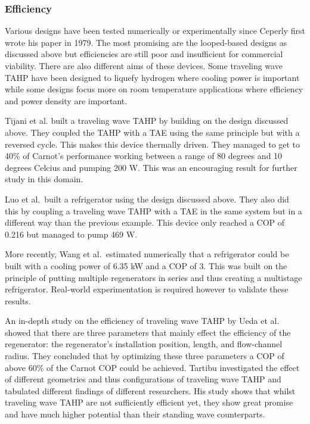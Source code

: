 \documentclass{article}
\newcommand{\newpara}
    {
      \bigbreak{}
      \noindent
    }
\begin{document}
\subsubsection{Efficiency}
Various designs have been tested numerically or experimentally since Ceperly first wrote his paper in 1979. The most promising are the looped-based designs as discussed above but efficiencies are still poor and insufficient for commercial viability. There are also different aims of these devices. Some traveling wave TAHP have been designed to liquefy hydrogen where cooling power is important while some designs focus more on room temperature applications where efficiency and power density are important\cite{WangRoomTemperature}.
\newpara{}
Tijani et al.\cite{spoelstraHighTemperature} built a traveling wave TAHP by building on the design discussed above. They coupled the TAHP with a TAE using the same principle but with a reversed cycle. This makes this device thermally driven. They managed to get to 40\% of Carnot's performance working between a range of 80 degrees and 10 degrees Celcius and pumping 200 W. This was an encouraging result for further study in this domain.
\newpara{}
Luo et al.\ built a refrigerator using the design discussed above\cite{LuoRefrigerator}. They also did this by coupling a traveling wave TAHP with a TAE in the same system but in a different way than the previous example. This device only reached a COP of 0.216 but managed to pump 469 W.
\newpara{}
More recently, Wang et al.\ estimated numerically that a refrigerator could be built with a cooling power of 6.35 kW and a COP of 3. This was built on the principle of putting multiple regenerators in series and thus creating a multistage refrigerator. Real-world experimentation is required however to validate these results.
\newpara{}
An in-depth study on the efficiency of traveling wave TAHP by Ueda et al. showed that there are three parameters that mainly effect the efficiency of the regenerator: the regenerator's installation position, length, and flow-channel radius\cite{uedaOptimization}. They concluded that by optimizing these three parameters a COP of above 60\% of the Carnot COP could be achieved. Tartibu investigated the effect of different geometries and thus configurations of traveling wave TAHP and tabulated different findings of different researchers\cite{TARTIBU2019102}. His study shows that whilst traveling wave TAHP are not sufficiently efficient yet, they show great promise and have much higher potential than their standing wave counterparts.
\end{document}
